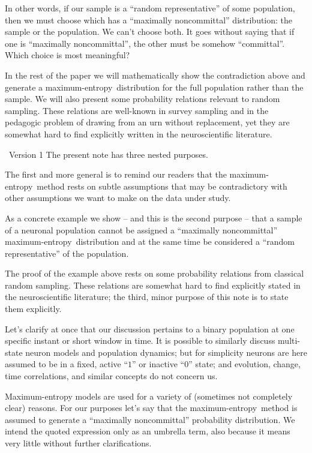 \documentclass{article}
\theoremstyle{remark}
\theoremstyle{innote}
\newcommand*{\citep}{\parencites}
\renewcommand*{\cite}{\citep}
\renewcommand*{\|}{\mathpunct{|}}%
\theoremstyle{simple}
\newcommand*{\puzzle}{{\fontencoding{U}\fontfamily{fontawesometwo}\selectfont\symbol{225}}}
\newcommand{\mynote}[1]{ {\color{notecolour}\puzzle\ #1}}
\newcommand*{\me}{maximum-entropy}
\begin{document}
In other words, if our sample is a \enquote{random representative} of some
population, then we must choose which has a \enquote{maximally
  noncommittal} distribution: the sample or the population. We can't choose
both. It goes without saying that if one is \enquote{maximally
  noncommittal}, the other must be somehow \enquote{committal}. Which
choice is most meaningful?

In the rest of the paper we will mathematically show the contradiction
above and generate a \me\ distribution for the full population rather than
the sample. We will also present some probability relations relevant to
random sampling. These relations are well-known in survey sampling and in
the pedagogic problem of drawing from an urn without replacement, yet they
are somewhat hard to find explicitly written in the neuroscientific
literature.

 \mynote{Version 1}
The present note has three nested purposes.

The first and more general is to remind our readers that the \me\ method
rests on subtle assumptions that may be contradictory with other
assumptions we want to make on the data under study.

As a concrete example we show -- and this is the second purpose -- that a
sample of a neuronal population cannot be assigned a \enquote{maximally
  noncommittal} \me\ distribution and at the same time be considered a
\enquote{random representative} of the population.

The proof of the example above rests on some probability relations from
classical random sampling. These relations are somewhat hard to find
explicitly stated in the neuroscientific literature; the third, minor
purpose of this note is to state them explicitly.


Let's clarify at once that our discussion pertains to a binary population at
one specific instant or short window in time. It is possible to
similarly discuss multi-state neuron models and population dynamics; but for
simplicity neurons are here assumed to be in a fixed, active \enquote{$1$}
or inactive \enquote{$0$} state; and evolution, change, time correlations,
and similar concepts do not concern us.


Maximum-entropy models are used for a variety of (sometimes not completely
clear) reasons. For our purposes let's say that the \me\ method is assumed
to generate a \enquote{maximally noncommittal} \cite{jaynes1963} probability
distribution. We intend the quoted expression only as an umbrella term,
also because it means very little without further clarifications.
\end{document}
